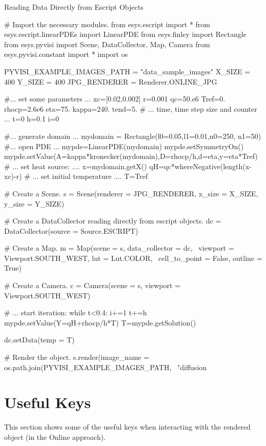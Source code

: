 \textsf{Reading Data Directly from Escript Objects}

\begin{python}
# Import the necessary modules.
from esys.escript import *
from esys.escript.linearPDEs import LinearPDE
from esys.finley import Rectangle
from esys.pyvisi import Scene, DataCollector, Map, Camera
from esys.pyvisi.constant import *
import os

PYVISI_EXAMPLE_IMAGES_PATH = "data_sample_images"
X_SIZE = 400
Y_SIZE = 400
JPG_RENDERER = Renderer.ONLINE_JPG

#... set some parameters ...
xc=[0.02,0.002]
r=0.001
qc=50.e6
Tref=0.
rhocp=2.6e6
eta=75.
kappa=240.
tend=5.
# ... time, time step size and counter ...
t=0
h=0.1
i=0

#... generate domain ...
mydomain = Rectangle(l0=0.05,l1=0.01,n0=250, n1=50)
#... open PDE ...
mypde=LinearPDE(mydomain)
mypde.setSymmetryOn()
mypde.setValue(A=kappa*kronecker(mydomain),D=rhocp/h,d=eta,y=eta*Tref)
# ... set heat source: ....
x=mydomain.getX()
qH=qc*whereNegative(length(x-xc)-r)
# ... set initial temperature ....
T=Tref

# Create a Scene.
s = Scene(renderer = JPG_RENDERER, x_size = X_SIZE, y_size = Y_SIZE)

# Create a DataCollector reading directly from escript objects.
dc = DataCollector(source = Source.ESCRIPT)

# Create a Map.
m = Map(scene = s, data_collector = dc, \
        viewport = Viewport.SOUTH_WEST, lut = Lut.COLOR, \
        cell_to_point = False, outline = True)

# Create a Camera.
c = Camera(scene = s, viewport = Viewport.SOUTH_WEST)

# ... start iteration:
while t<0.4:
      i+=1
      t+=h
      mypde.setValue(Y=qH+rhocp/h*T)
      T=mypde.getSolution()

      dc.setData(temp = T)
      
      # Render the object.
      s.render(image_name = os.path.join(PYVISI_EXAMPLE_IMAGES_PATH, \
              "diffusion%
\end{python}

\newpage

\section{Useful Keys}
This section shows some of the useful keys when interacting with the rendered
object (in the Online approach).

